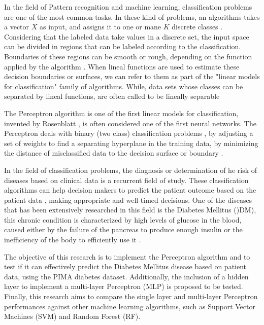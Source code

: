 \documentclass[10pt,twocolumn,letterpaper]{article}
\begin{document}
In the field of Pattern recognition and machine learning, classification problems are one of the most common tasks. In these kind of problems, an algorithms takes a vector $X$ as input, and assigns it to one or mane $K$ discrete classes \cite{Bishop2006}. Considering that the labeled data take values in a discrete set, the input space can be divided in regions that can be labeled according to the classification. Boundaries of these regions can be smooth or rough, depending on the function applied by the algorithm \cite{Hastie2009}. When lineal functions are used to estimate these decision boundaries or surfaces, we can refer to them as part of the "linear models for classification" family of algorithms. While, data sets whose classes can be separated by lineal functions, are often called to be lineally separable \cite{Bishop2006}

The Perceptron algorithm is one of the first linear models for classification, invented by Rosenblatt \cite{Rosenblatt1957}, is often considered one of the first neural networks. The Perceptron deals with binary (two class) classification problems \cite{Bishop2006}, by adjusting a set of weights to find a separating hyperplane in the training data, by minimizing the distance of misclassified data to the decision surface or boundary \cite{Hastie2009}.

In the field of classification problems, the diagnosis or determination of he risk of diseases based on clinical data is a recurrent field of study. These classification algorithms can help decision makers to predict the patient outcome based on the patient data \cite{Bellazzi2008}, making appropriate and well-timed decisions. One of the diseases that has been extensively researched in this field is the Diabetes Mellitus ()DM), this chronic condition is characterized by high levels of glucose in the blood, caused either by the failure of the pancreas to produce enough insulin or the inefficiency of the body to efficiently use it \cite{Wu2018}. 

The objective of this research is to implement the Perceptron algorithm and to test if it can effectively predict the Diabetes Mellitus disease based on patient data, using the PIMA diabetes dataset. Additionally, the inclusion of a hidden layer to implement a multi-layer Perceptron (MLP) is proposed to be tested. Finally, this research aims to compare the single layer and multi-layer Perceptron performances against other machine learning algorithms, such as Support Vector Machines (SVM) and Random Forest (RF).
\end{document}
